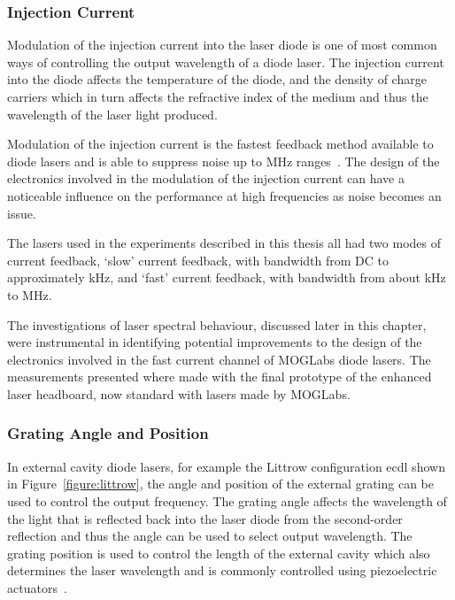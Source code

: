 \subsubsection{Injection Current}
Modulation of the injection current into the laser diode is one of most common ways of controlling the output wavelength of a diode laser.
The injection current into the diode affects the temperature of the diode, and the density of charge carriers which in turn affects the refractive index of the medium and thus the wavelength of the laser light produced.

Modulation of the injection current is the fastest feedback method available to diode lasers and is able to suppress noise up to \unit{MHz} ranges~\cite{ludlow_compact_2007,torrance_sub-kilohertz_2016}.
The design of the electronics involved in the modulation of the injection current can have a noticeable influence on the performance at high frequencies as noise becomes an issue.

The lasers used in the experiments described in this thesis all had two modes of current feedback, `slow' current feedback, with bandwidth from DC to approximately \unit[100]{kHz}, and `fast' current feedback, with bandwidth from about \unit[100]{kHz} to \unit[50]{MHz}.

The investigations of laser spectral behaviour, discussed later in this chapter, were instrumental in identifying potential improvements to the design of the electronics involved in the fast current channel of MOGLabs diode lasers.
The measurements presented where made with the final prototype of the enhanced laser headboard, now standard with lasers made by MOGLabs.

\subsubsection{Grating Angle and Position}
In external cavity diode lasers, for example the Littrow configuration \gls{ecdl} shown in Figure~\ref{figure:littrow}, the angle and position of the external grating can be used to control the output frequency.
The grating angle affects the wavelength of the light that is reflected back into the laser diode from the second-order reflection and thus the angle can be used to select output wavelength.
The grating position is used to control the length of the external cavity which also determines the laser wavelength and is commonly controlled using piezoelectric actuators~\cite{hawthorn_littrow_2001}.


